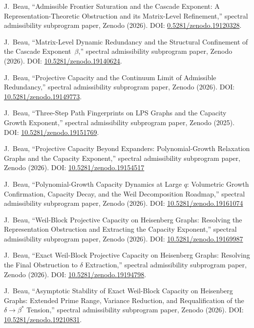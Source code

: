 J.~Beau,
``Admissible Frontier Saturation and the Cascade Exponent: A Representation-Theoretic Obstruction and its Matrix-Level
Refinement,''
spectral admissibility subprogram paper, Zenodo (2026).
DOI: \href{https://doi.org/10.5281/zenodo.19120328}{0.5281/zenodo.19120328}.

J.~Beau,
``Matrix-Level Dynamic Redundancy and the Structural Confinement of the Cascade Exponent~$\beta$,''
spectral admissibility subprogram paper, Zenodo (2026).
DOI: \href{https://doi.org/10.5281/zenodo.19140624}{10.5281/zenodo.19140624}.

J.~Beau,
``Projective Capacity and the Continuum Limit of Admissible Redundancy,''
spectral admissibility subprogram paper, Zenodo (2026).
DOI: \href{https://doi.org/10.5281/zenodo.19149773}{10.5281/zenodo.19149773}.

J.~Beau,
``Three-Step Path Fingerprints on LPS Graphs and the Capacity Growth Exponent,''
spectral admissibility subprogram paper, Zenodo (2025).
DOI: \href{https://doi.org/10.5281/zenodo.19151769}{10.5281/zenodo.19151769}.

J.~Beau,
``Projective Capacity Beyond Expanders: Polynomial-Growth Relaxation Graphs and the Capacity Exponent,''
spectral admissibility subprogram paper, Zenodo (2026).
DOI: \href{https://doi.org/10.5281/zenodo.19154517}{10.5281/zenodo.19154517}

J.~Beau,
``Polynomial-Growth Capacity Dynamics at Large $q$: Volumetric Growth Confirmation, Capacity Decay, and the Weil
Decomposition Roadmap,''
spectral admissibility subprogram paper, Zenodo (2026).
DOI: \href{https://doi.org/10.5281/zenodo.19161074}{10.5281/zenodo.19161074}

J.~Beau,
``Weil-Block Projective Capacity on Heisenberg Graphs: Resolving the Representation Obstruction and Extracting the
Capacity Exponent,''
spectral admissibility subprogram paper, Zenodo (2026).
DOI: \href{https://doi.org/10.5281/zenodo.19169987}{10.5281/zenodo.19169987}

J.~Beau,
``Exact Weil-Block Projective Capacity on Heisenberg Graphs: Resolving the Final Obstruction to $\delta$ Extraction,''
spectral admissibility subprogram paper, Zenodo (2026).
DOI: \href{https://doi.org/10.5281/zenodo.19194798}{10.5281/zenodo.19194798}.

J.~Beau,
``Asymptotic Stability of Exact Weil-Block Capacity on Heisenberg Graphs: Extended Prime Range, Variance Reduction,
and Requalification of the \(\delta \to \beta^*\) Tension,''
spectral admissibility subprogram paper, Zenodo (2026).
DOI: \href{https://doi.org/10.5281/zenodo.19210831}{10.5281/zenodo.19210831}.
